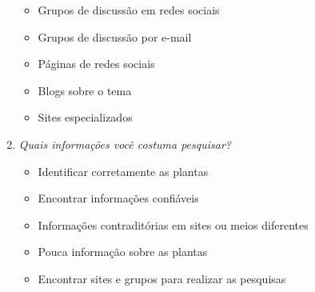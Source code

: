 \begin{enumerate}
  \begin{itemize}
  \tightlist
  \item
    Grupos de discussão em redes sociais
  \item
    Grupos de discussão por e-mail
  \item
    Páginas de redes sociais
  \item
    Blogs sobre o tema
  \item
    Sites especializados
  \end{itemize}
\item
  \emph{Quais informações você costuma pesquisar?}

  \begin{itemize}
  \tightlist
  \item
    Identificar corretamente as plantas
  \item
    Encontrar informações confiáveis
  \item
    Informações contraditórias em sites ou meios diferentes
  \item
    Pouca informação sobre as plantas
  \item
    Encontrar sites e grupos para realizar as pesquisas
  \end{itemize}
\end{enumerate}
